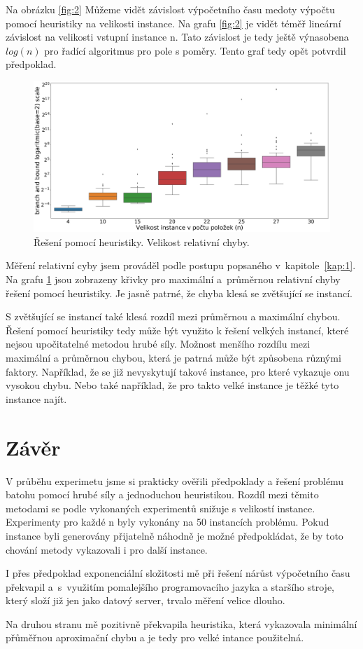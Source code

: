 \documentclass[11pt]{article}
\begin{document}
Na obrázku \ref{fig:2} Můžeme vidět závislost výpočetního času medoty výpočtu pomocí heuristiky na velikosti instance. Na grafu \ref{fig:2} je vidět  téměř lineární závislost na velikosti vstupní instance n. Tato závislost je tedy ještě výnasobena $log(n)$ pro řadící algoritmus pro pole s poměry. Tento graf tedy opět potvrdil předpoklad.
\begin{figure}\centering
	\includegraphics[scale=0.25]{img/boxBB}
 	\caption[3]{Řešení pomocí heuristiky. Velikost relativní chyby.}\label{fig:3}
 \end{figure} 	
Měření relativní cyby jsem prováděl podle postupu popsaného v~kapitole~\ref{kap:1}. Na grafu \ref{fig:3} jsou zobrazeny křivky pro maximální a~průměrnou relativní chyby řešení pomocí heuristiky. Je jasně patrné, že chyba klesá se zvětšující se instancí. 

S zvětšující se instancí také klesá rozdíl mezi průměrnou a maximální chybou. Řešení pomocí heuristiky tedy může být využito k řešení velkých instancí, které nejsou upočitatelné metodou hrubé síly. Možnost menšího rozdílu mezi maximální a průměrnou chybou, která je patrná může být způsobena různými faktory. Například, že se již nevyskytují takové instance, pro které vykazuje onu vysokou chybu. Nebo také například, že pro takto velké instance je těžké tyto instance najít. 

 
\section{Závěr}
V průběhu experimetu jsme si prakticky ověřili předpoklady a řešení problému batohu pomocí hrubé síly a jednoduchou heuristikou. Rozdíl mezi těmito metodami se podle vykonaných experimentů snižuje s velikostí instance. Experimenty pro každé n byly vykonány na 50 instancích problému. Pokud instance byli generovány přijatelně náhodně je možné předpokládat, že by toto chování metody vykazovali i pro další instance. 

I přes předpoklad exponenciální složitosti mě při řešení nárůst výpočetního času překvapil a~s~využitím pomalejšího programovacího jazyka a staršího stroje, který složí již jen jako datový server, trvalo měření velice dlouho. 

Na druhou stranu mě pozitivně překvapila heuristika, která vykazovala minimální přůměřnou aproximační chybu a je tedy pro velké intance použitelná.
\end{document}
